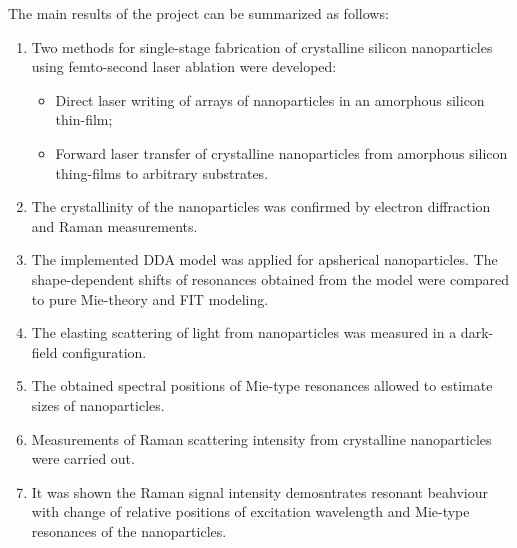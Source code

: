     \clearpage
    The main results of the project can be summarized as follows:
    \begin{enumerate}
        \item Two methods for single-stage fabrication of crystalline silicon nanoparticles using femto-second laser ablation were developed:
            \begin{itemize}
                \item Direct laser writing of arrays of nanoparticles in an amorphous silicon thin-film;
                \item Forward laser transfer of crystalline nanoparticles from amorphous silicon thing-films to arbitrary substrates.
            \end{itemize}
        \item The crystallinity of the nanoparticles was confirmed by electron diffraction and Raman measurements.
        \item The implemented DDA model was applied for apsherical nanoparticles.  The shape-dependent shifts of resonances
                obtained from the model were compared to pure Mie-theory and FIT modeling.
        \item The elasting scattering of light from nanoparticles was measured in a dark-field configuration.
        \item The obtained spectral positions of Mie-type resonances allowed to estimate sizes of nanoparticles.
        \item Measurements of Raman scattering intensity from crystalline nanoparticles were carried out.
        \item It was shown the Raman signal intensity demosntrates resonant beahviour with change of
                relative positions of excitation wavelength and Mie-type resonances of the nanoparticles.
    \end{enumerate}


\clearpage
